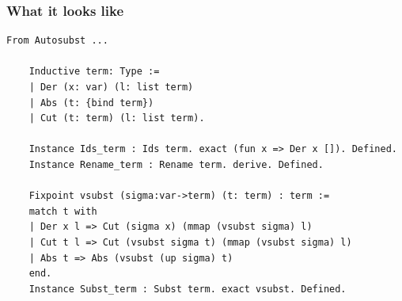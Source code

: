 \begin{frame}[fragile]
  \frametitle{What it looks like}

  \lstset{
    basicstyle=\scriptsize\ttfamily,
    breaklines=true,
    frame=single
  }

  \vspace{1ex}
  \begin{lstlisting}[language=Coq]
    From Autosubst ...
    
    Inductive term: Type :=
    | Der (x: var) (l: list term)
    | Abs (t: {bind term})
    | Cut (t: term) (l: list term).

    Instance Ids_term : Ids term. exact (fun x => Der x []). Defined.
    Instance Rename_term : Rename term. derive. Defined.
    
    Fixpoint vsubst (sigma:var->term) (t: term) : term :=
    match t with
    | Der x l => Cut (sigma x) (mmap (vsubst sigma) l)
    | Cut t l => Cut (vsubst sigma t) (mmap (vsubst sigma) l)
    | Abs t => Abs (vsubst (up sigma) t)
    end.
    Instance Subst_term : Subst term. exact vsubst. Defined.
  \end{lstlisting}
    
\end{frame}

